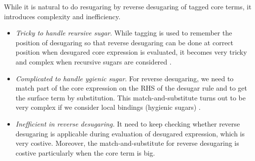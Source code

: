 While it is natural to do resugaring by reverse desugaring of tagged core terms, it introduces complexity and inefficiency.
\begin{itemize}
\item {\em Tricky to handle reursive sugar}. While tagging is used to remember the position of desugaring so that reverse desugaring can be done at correct position when desugared core expression is evaluated, it  becomes very tricky and complex when recursive sugars are considered \cite{resugaring}.

\item {\em Complicated to handle ygienic sugar}. For reverse desugaring, we need to match part of the core expression on the RHS of the desugar rule and to get the surface term by substitution. This match-and-substitute turns out to be very complex if we consider local bindings (hygienic sugars) \cite{hygienic}.

\item {\em Inefficient in reverse desugaring.} It need to keep checking whether reverse desugaring is applicable during evaluation of desugared expression, which is very costive. Moreover, the match-and-substitute for reverse desugaring is costive particularly when the core term is big.

\end{itemize}

